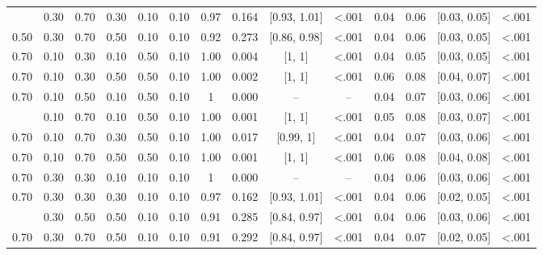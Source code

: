 \documentclass[
  11pt,
]{article}
\begin{document}
\begin{landscape}
\begin{ThreePartTable}
\begin{longtable}[t]{cccccccccccccc}
\addlinespace
0.50 & 0.30 & 0.70 & 0.30 & 0.10 & 0.10 & 0.97 & 0.164 & {}[0.93, 1.01] & <.001 & 0.04 & 0.06 & {}[0.03, 0.05] & <.001\\
0.50 & 0.30 & 0.70 & 0.50 & 0.10 & 0.10 & 0.92 & 0.273 & {}[0.86, 0.98] & <.001 & 0.04 & 0.06 & {}[0.03, 0.05] & <.001\\
0.70 & 0.10 & 0.30 & 0.10 & 0.50 & 0.10 & 1.00 & 0.004 & {}[1, 1] & <.001 & 0.04 & 0.05 & {}[0.03, 0.05] & <.001\\
0.70 & 0.10 & 0.30 & 0.50 & 0.50 & 0.10 & 1.00 & 0.002 & {}[1, 1] & <.001 & 0.06 & 0.08 & {}[0.04, 0.07] & <.001\\
0.70 & 0.10 & 0.50 & 0.10 & 0.50 & 0.10 & 1 & 0.000 & {} – & – & 0.04 & 0.07 & {}[0.03, 0.06] & <.001\\
\addlinespace
0.70 & 0.10 & 0.70 & 0.10 & 0.50 & 0.10 & 1.00 & 0.001 & {}[1, 1] & <.001 & 0.05 & 0.08 & {}[0.03, 0.07] & <.001\\
0.70 & 0.10 & 0.70 & 0.30 & 0.50 & 0.10 & 1.00 & 0.017 & {}[0.99, 1] & <.001 & 0.04 & 0.07 & {}[0.03, 0.06] & <.001\\
0.70 & 0.10 & 0.70 & 0.50 & 0.50 & 0.10 & 1.00 & 0.001 & {}[1, 1] & <.001 & 0.06 & 0.08 & {}[0.04, 0.08] & <.001\\
0.70 & 0.30 & 0.30 & 0.10 & 0.10 & 0.10 & 1 & 0.000 & {} – & – & 0.04 & 0.06 & {}[0.03, 0.06] & <.001\\
0.70 & 0.30 & 0.30 & 0.30 & 0.10 & 0.10 & 0.97 & 0.162 & {}[0.93, 1.01] & <.001 & 0.04 & 0.06 & {}[0.02, 0.05] & <.001\\
\addlinespace
0.70 & 0.30 & 0.50 & 0.50 & 0.10 & 0.10 & 0.91 & 0.285 & {}[0.84, 0.97] & <.001 & 0.04 & 0.06 & {}[0.03, 0.06] & <.001\\
0.70 & 0.30 & 0.70 & 0.50 & 0.10 & 0.10 & 0.91 & 0.292 & {}[0.84, 0.97] & <.001 & 0.04 & 0.07 & {}[0.02, 0.05] & <.001\\*
\end{longtable}
\end{ThreePartTable}

\end{landscape}
\end{document}
